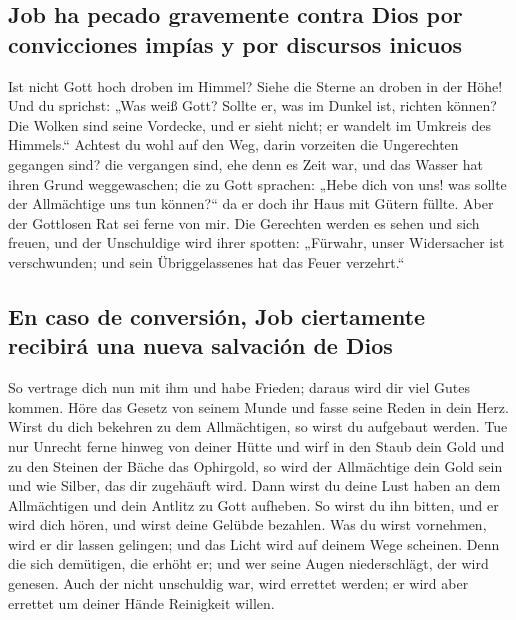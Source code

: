 \hypertarget{job-ha-pecado-gravemente-contra-dios-por-convicciones-impuxedas-y-por-discursos-inicuos}{%
\subsection{Job ha pecado gravemente contra Dios por convicciones impías
y por discursos
inicuos}\label{job-ha-pecado-gravemente-contra-dios-por-convicciones-impuxedas-y-por-discursos-inicuos}}

 Ist nicht Gott hoch droben im Himmel? Siehe die Sterne
an droben in der Höhe!  Und du sprichst: „Was weiß Gott?
Sollte er, was im Dunkel ist, richten können?  Die Wolken
sind seine Vordecke, und er sieht nicht; er wandelt im Umkreis des
Himmels.``  Achtest du wohl auf den Weg, darin vorzeiten
die Ungerechten gegangen sind?  die vergangen sind, ehe
denn es Zeit war, und das Wasser hat ihren Grund weggewaschen;
 die zu Gott sprachen: „Hebe dich von uns! was sollte der
Allmächtige uns tun können?{}``  da er doch ihr Haus mit
Gütern füllte. Aber der Gottlosen Rat sei ferne von mir. 
Die Gerechten werden es sehen und sich freuen, und der Unschuldige wird
ihrer spotten:  „Fürwahr, unser Widersacher ist
verschwunden; und sein Übriggelassenes hat das Feuer verzehrt.``

\hypertarget{en-caso-de-conversiuxf3n-job-ciertamente-recibiruxe1-una-nueva-salvaciuxf3n-de-dios}{%
\subsection{En caso de conversión, Job ciertamente recibirá una nueva
salvación de
Dios}\label{en-caso-de-conversiuxf3n-job-ciertamente-recibiruxe1-una-nueva-salvaciuxf3n-de-dios}}

 So vertrage dich nun mit ihm und habe Frieden; daraus
wird dir viel Gutes kommen.  Höre das Gesetz von seinem
Munde und fasse seine Reden in dein Herz.  Wirst du dich
bekehren zu dem Allmächtigen, so wirst du aufgebaut werden. Tue nur
Unrecht ferne hinweg von deiner Hütte  und wirf in den
Staub dein Gold und zu den Steinen der Bäche das Ophirgold,
 so wird der Allmächtige dein Gold sein und wie Silber,
das dir zugehäuft wird.  Dann wirst du deine Lust haben
an dem Allmächtigen und dein Antlitz zu Gott aufheben. 
So wirst du ihn bitten, und er wird dich hören, und wirst deine Gelübde
bezahlen.  Was du wirst vornehmen, wird er dir lassen
gelingen; und das Licht wird auf deinem Wege scheinen. 
Denn die sich demütigen, die erhöht er; und wer seine Augen
niederschlägt, der wird genesen.  Auch der nicht
unschuldig war, wird errettet werden; er wird aber errettet um deiner
Hände Reinigkeit willen.

